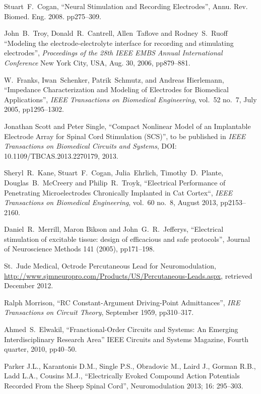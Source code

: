 \documentclass[journal, a4paper]{IEEEtran}
\begin{document}
\begin{thebibliography}{99}

    Stuart~F.~Cogan,
    ``Neural Stimulation and Recording Electrodes'',
    Annu. Rev. Biomed. Eng. 2008. pp275--309.

    John~B.~Troy, Donald~R.~Cantrell, Allen~Taflove and Rodney~S.~Ruoff
    ``Modeling the electrode-electrolyte interface for recording and stimulating electrodes'',
    {\em Proceedings of the 28th IEEE EMBS Annual International Conference}
    New York City, USA, Aug. 30, 2006, pp879--881.

W.~Franks, Iwan~Schenker, Patrik~Schmutz, and Andreas Hierlemann,
``Impedance Characterization and Modeling of Electrodes for Biomedical Applications'',
\emph{IEEE Transactions on Biomedical Engineering},
vol.~52 no.~7, July 2005, pp1295--1302.

Jonathan Scott and Peter Single,
``Compact Nonlinear Model of an Implantable Electrode Array for Spinal Cord Stimulation (SCS)'',
to be published in
{\em IEEE Transactions on Biomedical Circuits and Systems},
DOI: 10.1109/TBCAS.2013.2270179, 2013.

Sheryl~R.~Kane, Stuart~F.~Cogan, Julia~Ehrlich, Timothy~D.~Plante, Douglas~B.~McCreery and Philip~R.~Troyk,
``Electrical Performance of Penetrating Microelectrodes Chronically Implanted in Cat Cortex``,
{\em IEEE Transactions on Biomedical Engineering},
vol.~60 no.~8, August 2013, pp2153--2160.

Daniel~R.~Merrill, Maron Bikson and John~G.~R.\ Jefferys,
``Electrical stimulation of excitable tissue: design of efficacious and safe protocols'',
Journal of Neuroscience Methods 141 (2005), pp171--198.

St.~Jude Medical, Octrode Percutaneous Lead for Neuromodulation,
\url{http://www.sjmneuropro.com/Products/US/Percutaneous-Leads.aspx},
retrieved December 2012.

Ralph Morrison,
``RC Constant-Argument Driving-Point Admittances'',
{\em IRE Transactions on Circuit Theory},
September 1959, pp310--317.

Ahmed~S.~Elwakil,
``Franctional-Order Circuits and Systems: An Emerging Interdisciplinary Research Area''
IEEE Circuits and Systems Magazine, Fourth quarter, 2010, pp40--50.

Parker J.L., Karantonis D.M., Single P.S., Obradovic M., Laird J., Gorman R.B., Ladd L.A., Cousins M.J.,
``Electrically Evoked Compound Action Potentials Recorded From the Sheep Spinal Cord'',
Neuromodulation 2013; 16: 295--303.


\end{thebibliography}
\end{document}
